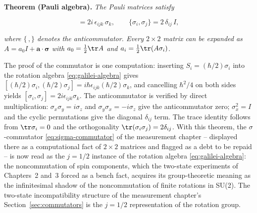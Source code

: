 \medskip\noindent\textbf{Theorem (Pauli algebra).} \emph{The Pauli matrices satisfy}
\begin{linenomath}
  \begin{equation}
    [\sigma_i,\sigma_j] = 2i\,\epsilon_{ijk}\,\sigma_k,
    \qquad
    \{\sigma_i,\sigma_j\} = 2\,\delta_{ij}\,I,
    \label{eq:pauli-algebra}
  \end{equation}
\end{linenomath}
\emph{where $\{\,,\}$ denotes the anticommutator. Every $2\times2$ matrix can be expanded as $A = a_0 I + \bm a\cdot\bm\sigma$ with $a_0 = \frac12\tr A$ and $a_i = \frac12\tr(A\sigma_i)$.}

The proof of the commutator is one computation: inserting $S_i = (\hbar/2)\sigma_i$ into the rotation algebra \eqref{eq:galilei-algebra} gives $[(\hbar/2)\sigma_i, (\hbar/2)\sigma_j] = i\hbar\epsilon_{ijk}(\hbar/2)\sigma_k$, and cancelling $\hbar^2/4$ on both sides yields $[\sigma_i,\sigma_j] = 2i\epsilon_{ijk}\sigma_k$. The anticommutator is verified by direct multiplication: $\sigma_x\sigma_y = i\sigma_z$ and $\sigma_y\sigma_x = -i\sigma_z$ give the anticommutator zero; $\sigma_x^2 = I$ and the cyclic permutations give the diagonal $\delta_{ij}$ term. The trace identity follows from $\tr\sigma_i = 0$ and the orthogonality $\tr(\sigma_i\sigma_j) = 2\delta_{ij}$. With this theorem, the $\sigma$-commutator \eqref{eq:sigma-commutator} of the measurement chapter -- displayed there as a computational fact of $2\times2$ matrices and flagged as a debt to be repaid -- is now read as the $j = 1/2$ instance of the rotation algebra \eqref{eq:galilei-algebra}: the noncommutation of spin components, which the two-state experiments of Chapters~2 and~3 forced as a bench fact, acquires its group-theoretic meaning as the infinitesimal shadow of the noncommutation of finite rotations in SU(2). The two-state incompatibility structure of the measurement chapter's Section~\ref{sec:commutators} is the $j=1/2$ representation of the rotation group.

